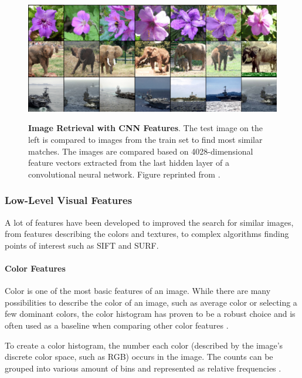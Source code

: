 \documentclass{article}
\begin{document}
\begin{figure}[h]
\centering
{\includegraphics[width=\linewidth]{CBIR/cnn_cbir}}
\caption{\label{fig:conv_cbir} \textbf{Image Retrieval with CNN Features}. The test image on the left is compared to images from the train set to find most similar matches. The images are compared based on 4028-dimensional feature vectors extracted from the last hidden layer of a convolutional neural network. Figure reprinted from \cite{NIPS2012_4824}.}
\end{figure}


\pagebreak
\subsubsection{Low-Level Visual Features}
A lot of features have been developed to improved the search for similar images, from features describing the colors and textures, to complex algorithms finding points of interest such as SIFT and SURF.

\paragraph{Color Features}
Color is one of the most basic features of an image. While there are many possibilities to describe the color of an image, such as average color or selecting a few dominant colors, the color histogram has proven to be a robust choice and is often used as a baseline when comparing other color features \cite{Torres_content-basedimage}.

To create a color histogram, the number each color (described by the image's discrete color space, such as RGB) occurs in the image. The counts can be grouped into various amount of bins and represented as relative frequencies \cite{Swain1991}.
\end{document}
